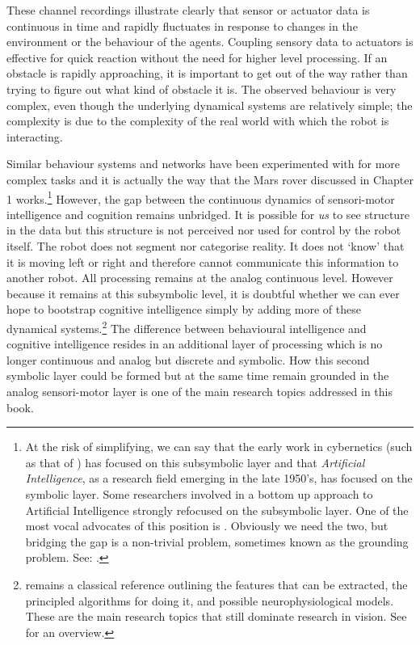 These channel recordings illustrate clearly that sensor or actuator
data is continuous in time and 
rapidly fluctuates in response to changes in the environment or the
behaviour of the agents. Coupling sensory data to actuators
is effective for quick reaction
without the need for higher level processing. If 
an obstacle is rapidly approaching, it is important to get out 
of the way rather than trying to figure out what kind of 
obstacle it is. The observed behaviour is very complex, even though
the underlying dynamical systems are relatively 
simple; the complexity is due to the complexity of the 
real world with which the robot is interacting. 

Similar behaviour systems and networks have
been experimented with 
for more complex tasks and it is actually the way that 
the Mars rover discussed in Chapter 1 works.\footnote{At 
the risk of simplifying, we can say that the early 
work in cybernetics (such as that of \cite{Braitenberg:1984}) 
has focused on this subsymbolic layer
and that {\it Artificial Intelligence}, as a research field
emerging in the late 1950's, has focused on the 
symbolic layer. Some researchers involved in a bottom up 
approach to Artificial Intelligence strongly refocused
on the subsymbolic layer. One of the most
vocal advocates of this position is \cite{Brooks:1992}.
Obviously we need the two, 
but bridging the gap is a non-trivial problem, sometimes known 
as the grounding problem. See: \cite{Harnad:1994}. }
However, the gap between the continuous dynamics of sensori-motor
intelligence and cognition remains unbridged. 
It is possible for {\itshape us} to see 
structure in the data but this structure is not perceived
nor used for control by the robot itself. 
The robot does not segment nor categorise
reality. It does not `know' that it is moving left or right 
and therefore cannot communicate this information to another robot. 
All processing remains at the analog continuous
level. However because it remains at this subsymbolic level, it is doubtful
whether we can ever hope to bootstrap cognitive
intelligence simply by adding more of these dynamical 
systems.\footnote{
\cite{Marr:1982} remains a classical reference outlining
the features that can be extracted, the
principled algorithms for doing it, and possible 
neurophysiological models. These are the main research
topics that still dominate research in vision. See 
\cite{Ullman:1996} for an overview.}
The difference between behavioural intelligence 
and cognitive intelligence resides in an additional 
layer of processing which is no longer continuous and analog 
but discrete and symbolic. How this second symbolic 
layer could be formed but at the same time remain 
grounded in the analog sensori-motor layer is one 
of the main research topics addressed in this book. 

